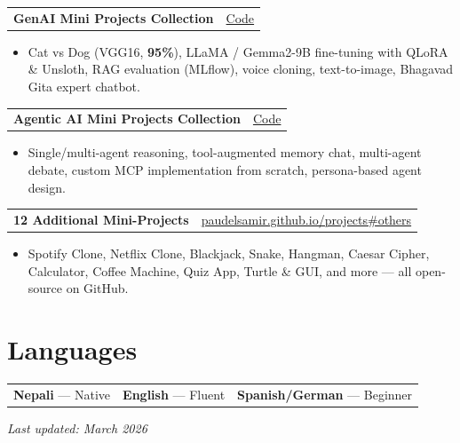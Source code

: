 \documentclass[10.5pt, a4paper]{article}
\makeatletter
\newcommand{\proj}[3]{%
  \vspace{1pt}%
  \begin{tabularx}{\linewidth}{@{}X r@{}}
    \textbf{#1}\enspace{\small\color{mid}\textit{#2}} & {\small #3}
  \end{tabularx}\vspace{0pt}}
\makeatother
\begin{document}
\vspace{4pt}

\proj{GenAI Mini Projects Collection}
     {--- RAG, Fine-tuning, Agents}
     {\href{https://github.com/paudelsamir/365DaysOfData/tree/main/15-Projects-Based-GenAI}{Code}}

\begin{itemize}
  \item Cat vs Dog (VGG16, \textbf{95\%}), LLaMA / Gemma2-9B fine-tuning with QLoRA \&
        Unsloth, RAG evaluation (MLflow), voice cloning, text-to-image,
        Bhagavad Gita expert chatbot.
\end{itemize}

\vspace{4pt}

\proj{Agentic AI Mini Projects Collection}
     {--- LangGraph, LangChain}
     {\href{https://github.com/paudelsamir/365DaysOfData/tree/main/16-Project-Based-AgenticAI}{Code}}

\begin{itemize}
  \item Single/multi-agent reasoning, tool-augmented memory chat, multi-agent debate,
        custom MCP implementation from scratch, persona-based agent design.
\end{itemize}

\vspace{4pt}

\proj{12 Additional Mini-Projects}
     {--- Web Apps, Games, CLI Tools}
     {\href{https://paudelsamir.github.io/projects\#others}{paudelsamir.github.io/projects\#others}}

\begin{itemize}
  \item Spotify Clone, Netflix Clone, Blackjack, Snake, Hangman, Caesar Cipher,
        Calculator, Coffee Machine, Quiz App, Turtle \& GUI, and more ---
        all open-source on GitHub.
\end{itemize}

\section{Languages}

\begin{tabularx}{\linewidth}{@{} X X X @{}}
  \textbf{Nepali} --- Native &
  \textbf{English} --- Fluent  &
  \textbf{Spanish/German} --- Beginner \\
\end{tabularx}

\vspace{6pt}
{\footnotesize\color{mid}\textit{Last updated: March 2026}}
\end{document}
